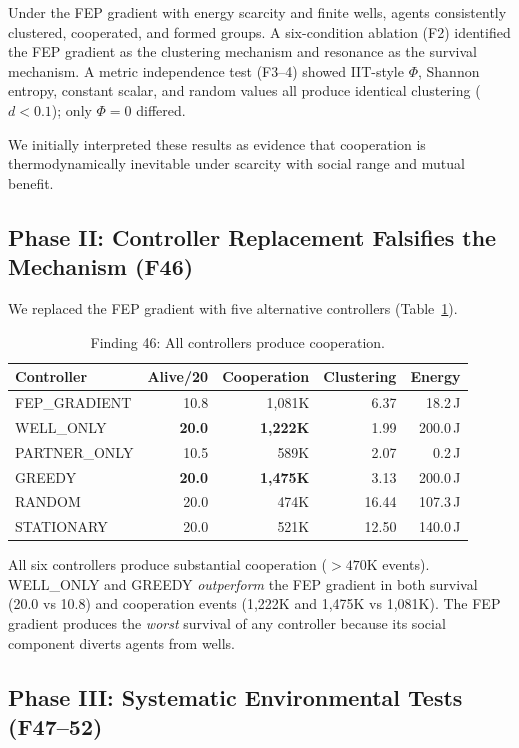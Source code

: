 \documentclass[12pt,a4paper]{article}
\begin{document}
Under the FEP gradient with energy scarcity and finite wells, agents consistently clustered, cooperated, and formed groups. A six-condition ablation (F2) identified the FEP gradient as the clustering mechanism and resonance as the survival mechanism. A metric independence test (F3--4) showed IIT-style $\Phi$, Shannon entropy, constant scalar, and random values all produce identical clustering ($d < 0.1$); only $\Phi = 0$ differed.

We initially interpreted these results as evidence that cooperation is thermodynamically inevitable under scarcity with social range and mutual benefit.

\subsection{Phase II: Controller Replacement Falsifies the Mechanism (F46)}

We replaced the FEP gradient with five alternative controllers (Table~\ref{tab:f46}).

\begin{table}[h]
\centering
\caption{Finding 46: All controllers produce cooperation.}
\label{tab:f46}
\begin{tabular}{lrrrr}
\toprule
Controller & Alive/20 & Cooperation & Clustering & Energy \\
\midrule
FEP\_GRADIENT & 10.8 & 1,081K & 6.37 & 18.2\,J \\
WELL\_ONLY & \textbf{20.0} & \textbf{1,222K} & 1.99 & 200.0\,J \\
PARTNER\_ONLY & 10.5 & 589K & 2.07 & 0.2\,J \\
GREEDY & \textbf{20.0} & \textbf{1,475K} & 3.13 & 200.0\,J \\
RANDOM & 20.0 & 474K & 16.44 & 107.3\,J \\
STATIONARY & 20.0 & 521K & 12.50 & 140.0\,J \\
\bottomrule
\end{tabular}
\end{table}

All six controllers produce substantial cooperation ($> 470$K events). WELL\_ONLY and GREEDY \emph{outperform} the FEP gradient in both survival (20.0 vs 10.8) and cooperation events (1,222K and 1,475K vs 1,081K). The FEP gradient produces the \emph{worst} survival of any controller because its social component diverts agents from wells.

\subsection{Phase III: Systematic Environmental Tests (F47--52)}
\end{document}
